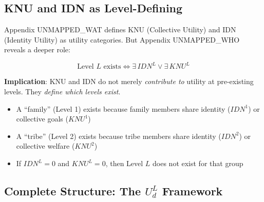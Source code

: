 \subsection{KNU and IDN as Level-Defining}

\begin{tcolorbox}[colback=yellow!5!white, colframe=yellow!75!black, 
    title=Critical Connection: KNU/IDN Define Levels (AAA Axiom UNMAPPED_SRL-2)]
Appendix UNMAPPED_WAT defines KNU (Collective Utility) and IDN (Identity Utility) as 
utility categories. But Appendix UNMAPPED_WHO reveals a deeper role:

\begin{equation}
\boxed{\text{Level } L \text{ exists} \iff \exists \, IDN^L \lor \exists \, KNU^L}
\end{equation}

\textbf{Implication}: KNU and IDN do not merely \textit{contribute to} utility at 
pre-existing levels. They \textit{define which levels exist}.

\begin{itemize}[nosep]
\item A ``family'' (Level 1) exists because family members share identity ($IDN^1$) 
      or collective goals ($KNU^1$)
\item A ``tribe'' (Level 2) exists because tribe members share identity ($IDN^2$) 
      or collective welfare ($KNU^2$)
\item If $IDN^L = 0$ and $KNU^L = 0$, then Level $L$ does not exist for that group
\end{itemize}
\end{tcolorbox}

\subsection{Complete Structure: The $U^L_d$ Framework}

